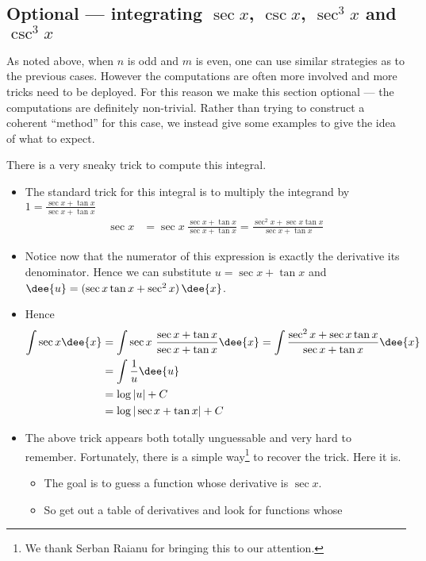 \subsection{Optional --- integrating $\sec x$, $\csc x$, $\sec^3 x$
                     and $\csc^3 x$}\label{sec:secantEtc}
As noted above, when $n$ is odd and $m$ is even, one can use similar strategies as to the
previous cases. However the computations are often more involved and more tricks
need to be deployed. For this reason we make this section optional --- the
computations are definitely non-trivial. Rather than trying to construct a
coherent ``method'' for this case, we instead give some examples to give the
idea of what to expect.
\begin{eg}\label{eg:TRGINTopta}
\soln There is a very sneaky trick to compute this integral.
\begin{itemize}
 \item The standard trick for this integral is to multiply the
integrand by $1=\frac{\sec x+\tan x}{\sec x+\tan x}$
\begin{align*}
  \sec x &= \sec x\ \frac{\sec x+\tan x}{\sec x+\tan x}
  = \frac{\sec^2x + \sec x \tan x}{\sec x+\tan x}
\end{align*}
\item Notice now that the numerator of this expression is exactly the derivative its
denominator. Hence we can substitute $u=\sec x+\tan x$ and
$\dee{u} = (\sec x\tan x+\sec^2 x)\,\dee{x}$.
\item Hence
\begin{align*}
\int \sec x\dee{x}
&=\int \sec x\ \frac{\sec x+\tan x}{\sec x+\tan x}\dee{x}
=\int \frac{\sec^2 x+\sec x\tan x}{\sec x+\tan x}\dee{x} \\
&=\int \frac{1}{u}\dee{u} \\
&=\log |u|+C \\
&=\log|\sec x+\tan x|+C
\end{align*}
\item
The above trick appears both totally unguessable and very hard to remember.
Fortunately, there is a simple
way\footnote{We thank Serban Raianu for bringing this to our attention.} 
to recover the trick. Here it is.
\begin{itemize}
   \item  The goal is to guess a function whose derivative is $\sec x$.
   \item  So get out a table of derivatives and look for functions whose

\end{itemize}
\end{itemize}
\end{eg}
